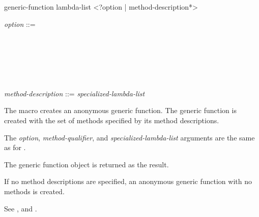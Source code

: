 

\begin{defmac}
generic-function lambda-list <?option | {method-description}*>

\begin{tabbing}
\emph{option} ::=  \\
~~~ \Mor~ \\
~~~ \Mor~ \\
~~~ \Mor~ \\
~~~ \Mor~ \\
~~~ \Mor~ \\\\
 \emph{method-description} ::=    \emph{specialized-lambda-list} 
\cd{)}
\end{tabbing}
The  macro creates an anonymous generic
function. The generic function is created with the set of methods
specified by its method descriptions.

The \emph{option}, \emph{method-qualifier}, and \emph{specialized-lambda-list}
arguments are the same as for .

The generic function object is returned as the result.

If no method descriptions are specified, an anonymous generic function with no
methods is created.

See , 
 and .
\end{defmac}







